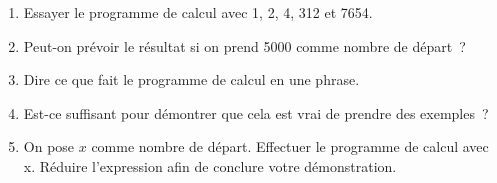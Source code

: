 \documentclass[11pt]{article}
\begin{document}
\begin{enumerate}
  \item Essayer le programme de calcul avec 1, 2, 4, 312 et 7654.
  \item Peut-on prévoir le résultat si on prend 5000 comme nombre de départ ?
  \item Dire ce que fait le programme de calcul en une phrase.
  \item Est-ce suffisant pour démontrer que cela est vrai de prendre des exemples ?
  \item On pose $x$ comme nombre de départ. Effectuer le programme de calcul avec x. Réduire l’expression afin de conclure votre démonstration.
\end{enumerate}
\end{document}
